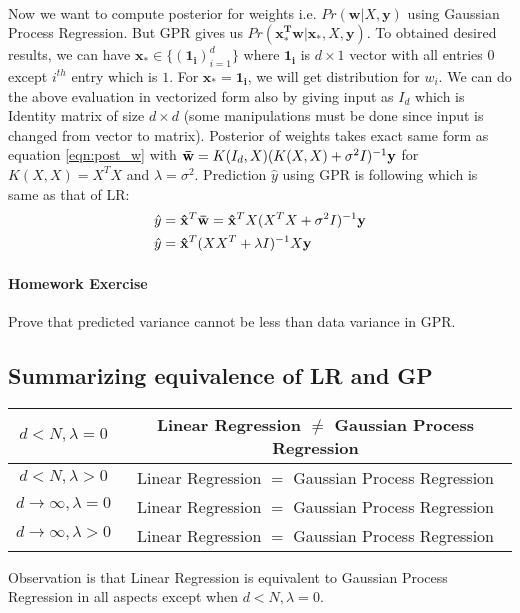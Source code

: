 \documentclass[12pt]{article}
\begin{document}
\paragraph{} Now we want to compute posterior for weights i.e. $Pr(\mathbf{w}| X, \mathbf{y})$ using Gaussian Process Regression. But GPR gives us $Pr(\mathbf{x_*^Tw} | \mathbf{x_*}, X, \mathbf{y})$. To obtained desired results, we can have $\mathbf{x_*} \in\{ (\mathbf{1_i})_{i=1}^d\}$ where $\mathbf{1_i}$ is $d \times 1$ vector with all entries $0$ except $i^{th}$ entry which is $1$. For $\mathbf{x_*} = \mathbf{1_i}$, we will get distribution for $w_i$. We can do the above evaluation in vectorized form also by giving input as $I_d$ which is Identity matrix of size $d \times d$ (some manipulations must be done since input is changed from vector to matrix). Posterior of weights takes exact same form as equation \ref{eqn:post_w} with $\mathbf{\Bar{w}} = K(I_d, X) (K(X,X) + \sigma^2I)^{-1} \mathbf{y}$ for $K(X,X) = X^TX$ and $\lambda = \sigma^2$. Prediction $\hat{y}$ using GPR is following which is same as that of LR:
\begin{align}
    \hat{y} &= \mathbf{\hat{x}}^T \mathbf{\Bar{w}} = \mathbf{\hat{x}}^T X(X^TX + \sigma^2I)^{-1}\mathbf{y} \nonumber \\
    \hat{y} &=  \mathbf{\hat{x}}^T (XX^T + \lambda I)^{-1} X\mathbf{y}
\end{align}

\paragraph{Homework Exercise} Prove that predicted variance cannot be less than data variance in GPR.


\subsection{Summarizing equivalence of LR and GP}
\begin{center}
\begin{tabular}{|c|c|} 
    \hline
    $d<N,\lambda=0$ & Linear Regression $\neq$ Gaussian Process Regression\\
    \hline
    $d<N,\lambda>0$ & Linear Regression $=$ Gaussian Process Regression\\ 
    \hline
    $d\xrightarrow[]{}\infty,\lambda=0$ & Linear Regression $=$ Gaussian Process Regression\\ 
    \hline
    $d\xrightarrow[]{}\infty,\lambda>0$ & Linear Regression $=$ Gaussian Process Regression\\
    \hline
\end{tabular}
\end{center}
Observation is that Linear Regression is equivalent to Gaussian Process Regression in all aspects except when $d < N, \lambda =0$. 
\end{document}
